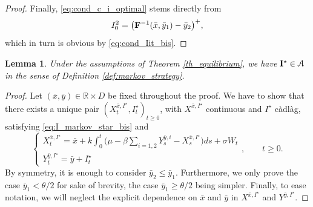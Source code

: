\documentclass[10pt]{article}
\numberwithin{equation}{section}
\theoremstyle{plain}
\numberwithin{theorem}{section}
\newtheorem{lemma}[theorem]{Lemma}                              %
\theoremstyle{definition}
\def \b {{\beta}}
\def \R {\mathbb{R}}
\newcommand{\<}{\langle}
\renewcommand{\>}{\rangle}
\renewcommand{\(}{\left(}
\renewcommand{\)}{\right)}
\newcommand\contr{{\bf I}}
\def \R  {{\mathbb {R}}}
\def \b {{\beta}}
\def \R {{\mathbb {R}}}
\begin{document}
{{{\begin{proof}
Finally, \eqref{eq:cond_c_i_optimal} stems directly from 
\begin{equation}%
I^{2}_0 = \big( {\bf F}^{-1}(\bar x,\bar y_1) - \bar y_2 \big)^+,
\end{equation}
which in turn is obvious by \eqref{eq:cond_Iit_bis}.
\end{proof}
\begin{lemma}\label{lem:admissibility}
Under the assumptions of Theorem \ref{th_equilibrium}, we have $\contr^{\star}\in\mathcal{A}$ in the sense of Definition \ref{def:markov_strategy}. %
\end{lemma}
\begin{proof}
Let $(\bar x , \bar y)\in \R\times D$ be fixed throughout the proof. We have to show that there exists a unique pair $(X^{\bar x,I^{\star}}_t,I^{\star}_t)_{t\geq 0}$, with $X^{\bar x,I^{\star}}$ continuous and $I^{\star}$ c\`adl\`ag, satisfying
\eqref{eq:I_markov_star_bis} and
\begin{equation}\label{eq:system_XY_proof}
\begin{cases}
X^{\bar x,I^{\star}}_t = \bar x + k \int_0^t \big(\mu-\b \sum_{i=1,2}Y_{s}^{\bar y,i}-X^{\bar x,I^{\star}}_s\big)ds+\sigma W_t\\
Y^{\bar y,I^{\star}}_t = \bar y + I^{\star}_t
\end{cases}, \qquad t \geq0.
\end{equation}
By symmetry, it is enough to consider $\bar y_2\leq \bar y_1$. {Furthermore, we only prove the case $\bar y_1 <\theta/2$ for sake of brevity, the case $\bar y_1 \geq \theta/2$ being simpler.} {Finally, to ease notation, we will neglect the explicit dependence on $\bar x$ and $\bar y$ %
in $X^{\bar x,I^{\star}}$ and $Y^{\bar y,I^{\star}}$.} 
\vspace{2pt}


\end{proof}}}}
\end{document}
